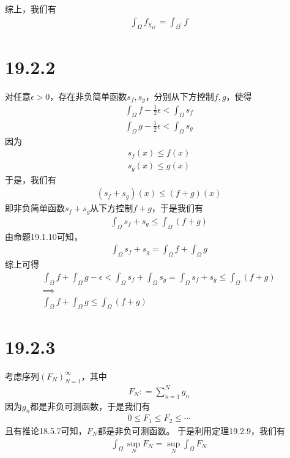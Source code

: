 \documentclass{article}
\begin{document}
\begin{itemize}
        综上，我们有
        \begin{align*}
          \int_{\Omega} f_{\chi_{\Omega^\prime}} = \int_{\Omega^\prime} f
        \end{align*}

\end{itemize}

\section*{19.2.2}

对任意$\epsilon > 0$，存在非负简单函数$s_f, s_g$，分别从下方控制$f, g$，使得
\begin{align*}
  \int_{\Omega} f - \frac{1}{2}\epsilon < \int_{\Omega} s_f \\
  \int_{\Omega} g - \frac{1}{2}\epsilon < \int_{\Omega} s_g
\end{align*}
因为
\begin{align*}
  s_f(x) \leq f(x) \\
  s_g(x) \leq g(x)
\end{align*}
于是，我们有
\begin{align*}
  (s_f + s_g)(x) \leq (f + g)(x)
\end{align*}
即非负简单函数$s_f + s_g$从下方控制$f + g$，于是我们有
\begin{align*}
  \int_{\Omega} s_f + s_g \leq \int_{\Omega} (f + g)
\end{align*}
由命题19.1.10可知，
\begin{align*}
  \int_{\Omega} s_f + s_g =  \int_{\Omega} f + \int_{\Omega} g
\end{align*}
综上可得
\begin{align*}
  \int_{\Omega} f + \int_{\Omega} g - \epsilon < \int_{\Omega} s_f + \int_{\Omega} s_g = \int_{\Omega} s_f + s_g \leq \int_{\Omega} (f + g) \\
  \implies                                                                                                                                  \\
  \int_{\Omega} f + \int_{\Omega} g \leq \int_{\Omega} (f + g)
\end{align*}

\section*{19.2.3}

考虑序列$(F_N)_{N = 1}^\infty$，其中
\begin{align*}
  F_N : = \sum \limits_{n = 1}^N g_n
\end{align*}
因为$g_n$都是非负可测函数，于是我们有
\begin{align*}
  0 \leq F_1 \leq F_2 \leq \cdots
\end{align*}
且有推论18.5.7可知，$F_N$都是非负可测函数。
于是利用定理19.2.9，我们有
\begin{align*}
  \int_{\Omega} \sup\limits_{N} F_N = \sup\limits_{N} \int_{\Omega} F_N
\end{align*}
\end{document}
